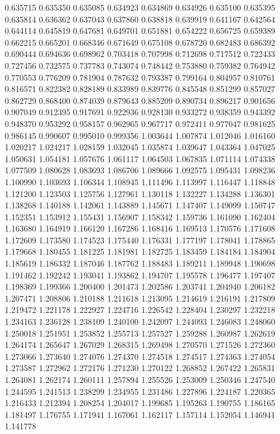 0.635715
0.635350
0.635085
0.634923
0.634869
0.634926
0.635100
0.635395
0.635814
0.636362
0.637043
0.637860
0.638818
0.639919
0.641167
0.642564
0.644114
0.645819
0.647681
0.649701
0.651881
0.654222
0.656725
0.659389
0.662215
0.665201
0.668346
0.671649
0.675108
0.678720
0.682483
0.686392
0.690444
0.694636
0.698962
0.703418
0.707998
0.712698
0.717512
0.722433
0.727456
0.732575
0.737783
0.743074
0.748442
0.753880
0.759382
0.764942
0.770553
0.776209
0.781904
0.787632
0.793387
0.799164
0.804957
0.810761
0.816571
0.822382
0.828189
0.833989
0.839776
0.845548
0.851299
0.857027
0.862729
0.868400
0.874039
0.879643
0.885209
0.890734
0.896217
0.901656
0.907049
0.912395
0.917691
0.922936
0.928130
0.933272
0.938359
0.943392
0.948370
0.953292
0.958157
0.962965
0.967717
0.972411
0.977047
0.981625
0.986145
0.990607
0.995010
0.999356
1.003644
1.007874
1.012046
1.016160
1.020217
1.024217
1.028159
1.032045
1.035874
1.039647
1.043364
1.047025
1.050631
1.054181
1.057676
1.061117
1.064503
1.067835
1.071114
1.074338
1.077509
1.080628
1.083693
1.086706
1.089666
1.092575
1.095431
1.098236
1.100990
1.103693
1.106344
1.108945
1.111496
1.113997
1.116447
1.118848
1.121200
1.123503
1.125756
1.127961
1.130118
1.132227
1.134288
1.136301
1.138268
1.140188
1.142061
1.143889
1.145671
1.147407
1.149099
1.150747
1.152351
1.153912
1.155431
1.156907
1.158342
1.159736
1.161090
1.162404
1.163680
1.164919
1.166120
1.167286
1.168416
1.169513
1.170576
1.171608
1.172609
1.173580
1.174523
1.175440
1.176331
1.177197
1.178041
1.178865
1.179668
1.180455
1.181225
1.181981
1.182725
1.183459
1.184184
1.184904
1.185619
1.186332
1.187046
1.187762
1.188483
1.189211
1.189948
1.190698
1.191462
1.192242
1.193041
1.193862
1.194707
1.195578
1.196477
1.197407
1.198369
1.199366
1.200400
1.201473
1.202586
1.203741
1.204940
1.206182
1.207471
1.208806
1.210188
1.211618
1.213095
1.214619
1.216191
1.217809
1.219472
1.221178
1.222927
1.224716
1.226542
1.228404
1.230297
1.232218
1.234163
1.236128
1.238109
1.240100
1.242097
1.244093
1.246083
1.248060
1.250018
1.251951
1.253852
1.255713
1.257527
1.259288
1.260987
1.262619
1.264174
1.265647
1.267029
1.268315
1.269498
1.270570
1.271526
1.272360
1.273066
1.273640
1.274076
1.274370
1.274518
1.274517
1.274363
1.274054
1.273587
1.272962
1.272176
1.271230
1.270122
1.268852
1.267422
1.265831
1.264081
1.262174
1.260111
1.257894
1.255526
1.253009
1.250346
1.247540
1.244595
1.241513
1.238299
1.234955
1.231486
1.227896
1.224187
1.220365
1.216433
1.212394
1.208254
1.204017
1.199685
1.195263
1.190755
1.186165
1.181497
1.176755
1.171941
1.167061
1.162117
1.157114
1.152054
1.146941
1.141778
